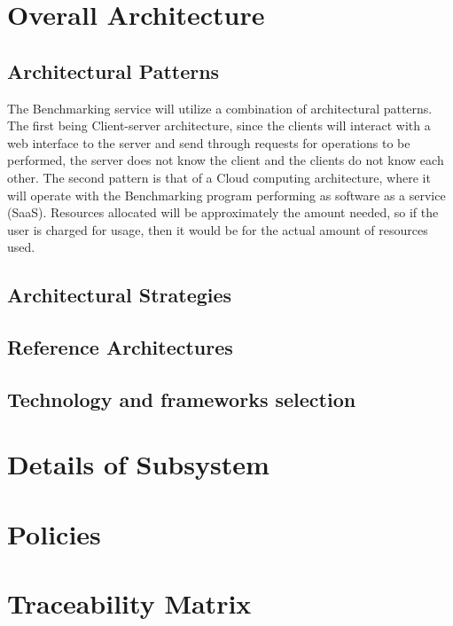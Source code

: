 \documentclass[runningheads,a4paper]{article}
\begin{document}
\section{Overall Architecture}
\subsection{Architectural Patterns}
The Benchmarking service will utilize a combination of architectural patterns. The first being Client-server architecture, since the clients will interact with a web interface to the server and send through requests for operations to be performed, the server does not know the client and the clients do not know each other. The second pattern is that of a Cloud computing architecture, where it will operate with the Benchmarking program performing as software as a service (SaaS). Resources allocated will be approximately the amount needed, so if the user is charged for usage, then it would be for the actual amount of resources used.\\

\subsection{Architectural Strategies}

\subsection{Reference Architectures}

\subsection{Technology and frameworks selection}

\section{Details of Subsystem}

\section{Policies}

\section{Traceability Matrix}

\end{document}
